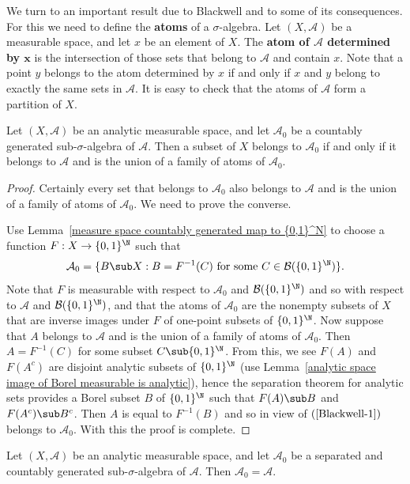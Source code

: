 We turn to an important result due to Blackwell and to some of its consequences. For this we need to define the \textbf{atoms} of a $\sigma$-algebra. Let $(X,\mathcal{A})$ be a measurable space, and let $x$ be an element of $X$. The \textbf{atom of $\mathcal{A}$ determined by $\bm{x}$} is the intersection of those sets that belong to $\mathcal{A}$ and contain $x$. Note that a point $y$ belongs to the atom determined by $x$ if and only if $x$ and $y$ belong to exactly the same sets in $\mathcal{A}$. It is easy to check that the atoms of $\mathcal{A}$ form a partition of $X$.
\begin{proposition}\label{Blackwell}
Let $(X,\mathcal{A})$ be an analytic measurable space, and let $\mathcal{A}_0$ be a countably generated sub-$\sigma$-algebra of $\mathcal{A}$. Then a subset of $X$ belongs to $\mathcal{A}_0$ if and only if it belongs to $\mathcal{A}$ and is the union of a family of atoms of $\mathcal{A}_0$.
\end{proposition}
\begin{proof}
Certainly every set that belongs to $\mathcal{A}_0$ also belongs to $\mathcal{A}$ and is the union of a family of atoms of $\mathcal{A}_0$. We need to prove the converse.\par
Use Lemma~\ref{measure space countably generated map to {0,1}^N} to choose a function $F:X\to\{0,1\}^\N$ such that
\begin{align}\label{Blackwell-1}
\mathcal{A}_0=\{B\sub X:B=F^{-1}(C)\text{ for some $C\in\mathcal{B}(\{0,1\}^\N)$}\}.
\end{align}
Note that $F$ is measurable with respect to $\mathcal{A}_0$ and $\mathcal{B}(\{0,1\}^\N)$ and so with respect to $\mathcal{A}$ and $\mathcal{B}(\{0,1\}^\N)$, and that the atoms of $\mathcal{A}_0$ are the nonempty subsets of $X$ that are inverse images under $F$ of one-point subsets of $\{0,1\}^\N$. Now suppose that $A$ belongs to $\mathcal{A}$ and is the union of a family of atoms of $\mathcal{A}_0$. Then $A=F^{-1}(C)$ for some subset $C\sub\{0,1\}^\N$. From this, we see $F(A)$ and $F(A^c)$ are disjoint analytic subsets of $\{0,1\}^\N$ (use Lemma~\ref{analytic space image of Borel measurable is analytic}), hence the separation theorem for analytic sets provides a Borel subset $B$ of $\{0,1\}^\N$ such that $F(A)\sub B$ and $F(A^c)\sub B^c$. Then $A$ is equal to $F^{-1}(B)$ and so in view of $(\ref{Blackwell-1})$ belongs to $\mathcal{A}_0$. With this the proof is complete.
\end{proof}
\begin{corollary}\label{analytic separated and countably generated subalgebra equal}
Let $(X,\mathcal{A})$ be an analytic measurable space, and let $\mathcal{A}_0$ be a separated and countably generated sub-$\sigma$-algebra of $\mathcal{A}$. Then $\mathcal{A}_0=\mathcal{A}$.
\end{corollary}
